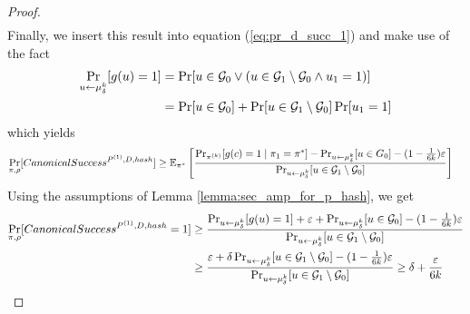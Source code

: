 \begin{proof}
\begin{align}
\end{align}
Finally, we insert this result into equation (\ref{eq:pr_d_succ_1}) and make use of the fact
\begin{align*}
\underset{u \leftarrow \mu_{\delta}^k}{\Pr}[g(u) = 1]
&= \Pr[u \in \mathcal{G}_0 \lor ( u \in \mathcal{G}_1 \setminus \mathcal{G}_0 \land u_1 = 1)] \notag\\
&= \Pr[u \in \mathcal{G}_0] + \Pr[u \in \mathcal{G}_1 \setminus \mathcal{G}_0] \Pr[u_1 = 1]
\end{align*}
which yields
\begin{align*}
  \underset{\pi, \rho}{\Pr}[CanonicalSuccess^{P^{(1)}, D, hash}]
&\geq \mathbb{E}_{\pi^*}\left[\frac{{\Pr}_{\pi^{(k)}}[g(c) = 1 \mid \pi_1 = \pi^*] -
{\Pr}_{u \leftarrow \mu_{\delta}^{k}}[u \in G_0] - (1 - \frac{1}{6k})\varepsilon} {\Pr_{u \leftarrow \mu_{\delta}^{k}}[u \in \mathcal{G}_1 \setminus \mathcal{G}_0]}\right] \notag
 \end{align*}
 Using the assumptions of Lemma \ref{lemma:sec_amp_for_p_hash}, we get
 \begin{align}
   \label{eq:proof_final}
   \underset{\pi, \rho}{\Pr}[CanonicalSuccess^{P^{(1)}, D, hash} = 1]
 &\geq \frac{ {\Pr}_{u \leftarrow \mu_{\delta}^{k}}[g(u) = 1] + \varepsilon +
 \Pr_{u \leftarrow \mu_{\delta}^{k}}[u \in \mathcal{G}_0] - (1 - \frac{1}{6k})\varepsilon} {\Pr_{u \leftarrow \mu_{\delta}^{k}}[u \in \mathcal{G}_1 \setminus \mathcal{G}_0]} \notag\\
 &\geq \frac{\varepsilon + \delta\Pr_{u \leftarrow \mu_{\delta}^{k}}[u \in \mathcal{G}_1 \setminus \mathcal{G}_0] - (1 - \frac{1}{6k})\varepsilon}
{\Pr_{u \leftarrow \mu_{\delta}^{k}}[u \in \mathcal{G}_1 \setminus \mathcal{G}_0]} \geq \delta + \frac{\varepsilon}{6k}
\end{align}
\end{proof}

